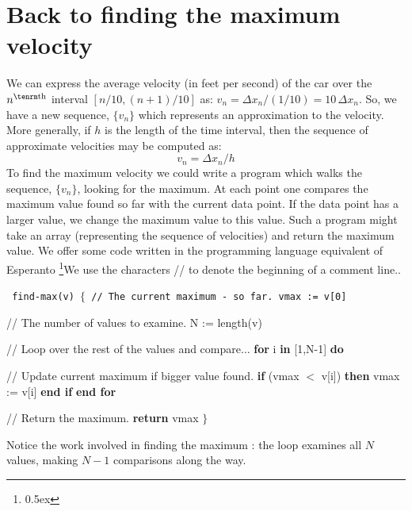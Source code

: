 \section{Back to finding the maximum velocity}
We can express the average velocity (in feet per second) of the car over the $n^{\rm th}$ interval
$[n/10, (n+1)/10]$ as: $v_n = \Delta x_n / (1/10) = 10 \, \Delta x_n$. So, we have a new
sequence, $\{v_n\}$ which represents an approximation to the velocity.
More generally, if $h$ is the length of the time interval, then the sequence 
of approximate velocities may be computed as:
$$
v_n = \Delta x_n / h
$$
To find the maximum velocity we could write a program which walks the sequence,
$\{v_n\}$, looking for the maximum. At each point one compares the maximum 
value found so far with the current data point. If the data point has a larger value, 
we change the maximum value to this value. Such a program might take an array 
(representing the sequence of velocities) and return the maximum value. 
We offer some code written in the programming language equivalent of
	Esperanto%
\footnote{\kern 0.5pt \raise 0.5ex \hbox{\ddag}}{We use the characters // to denote 
the beginning of a comment line.}.
\vskip 12pt
{\tt \obeylines \obeywhitespace \parskip=0pt
find-max(v) $\lbrace$
   // The current maximum - so far.
   vmax := v[0]

   // The number of values to examine.
   N := length(v)

   // Loop over the rest of the values and compare...
  {\bf for\/} i {\bf in\/} [1,N-1] {\bf do\/}

      // Update current maximum if bigger value found.
      {\bf if\/} (vmax $<$ v[i]) {\bf then\/}
         vmax := v[i] 
      {\bf end if\/}
   {\bf end for\/}
  
   // Return the maximum.
  {\bf return\/} vmax 
$\rbrace$
}

Notice the work involved in finding the maximum : the loop examines
all $N$ values, making $N-1$ comparisons along the way.

